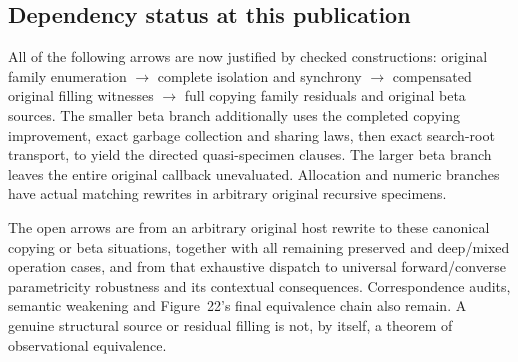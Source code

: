 \subsection{Dependency status at this publication}
All of the following arrows are now justified by checked constructions:
original family enumeration $\longrightarrow$ complete isolation and
synchrony $\longrightarrow$ compensated original filling witnesses
$\longrightarrow$ full copying family residuals and original beta sources.
The smaller beta branch additionally uses the completed copying improvement,
exact garbage collection and sharing laws, then exact search-root transport,
to yield the directed quasi-specimen clauses. The larger beta branch leaves
the entire original callback unevaluated. Allocation and numeric branches
have actual matching rewrites in arbitrary original recursive specimens.

The open arrows are from an arbitrary original host rewrite to these
canonical copying or beta situations, together with all remaining preserved
and deep/mixed operation cases, and from that exhaustive dispatch to universal
forward/converse parametricity robustness and its contextual consequences.
Correspondence audits, semantic weakening and Figure~22's final equivalence
chain also remain. A genuine structural source or residual filling is not,
by itself, a theorem of observational equivalence.
